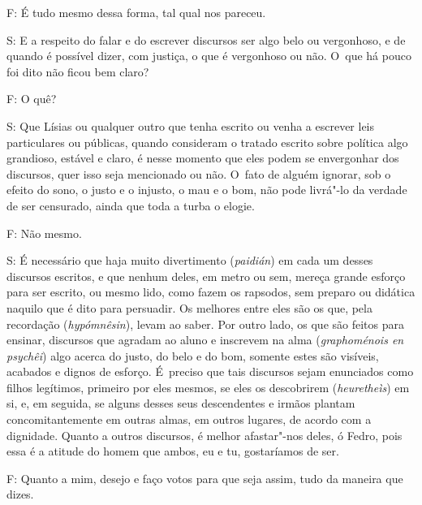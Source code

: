 

F: É tudo mesmo dessa forma, tal qual nos pareceu.

 

S: E a respeito do falar e do escrever discursos ser algo belo ou
vergonhoso, e de quando é possível dizer, com justiça, o que é
vergonhoso ou não. O~que há pouco foi dito não ficou bem claro?

 

F: O quê?

 

S: Que Lísias ou qualquer outro que tenha escrito ou venha a escrever
leis particulares ou públicas, quando consideram o tratado escrito sobre
política algo grandioso, estável e claro, é nesse momento que eles podem
se envergonhar dos discursos, quer isso seja mencionado ou não. O~fato
de alguém ignorar, sob o efeito do sono, \bekker{[277e]} o justo e o injusto,
o mau e o bom, não pode livrá"-lo da verdade de ser censurado, ainda que
toda a turba o elogie.

 

F: Não mesmo.

 

S: É necessário que haja muito divertimento (\emph{paidián}) em cada um
desses discursos escritos, e que nenhum deles, em metro ou sem, mereça
grande esforço para ser escrito, ou mesmo lido, como fazem os rapsodos,
sem preparo ou didática naquilo que é dito para persuadir. \bekker{[278a]} Os
melhores entre eles são os que, pela recordação (\emph{hypómnêsin}),
levam ao saber. Por outro lado, os que são feitos para ensinar,
discursos que agradam ao aluno e inscrevem na alma (\emph{graphoménois
en psychêi}) algo acerca do justo, do belo e do bom, somente estes são
visíveis, acabados e dignos de esforço. É~preciso que tais discursos
sejam enunciados como filhos legítimos, \bekker{[278b]} primeiro por eles
mesmos, se eles os descobrirem (\emph{heuretheìs}) em si, e, em seguida,
se alguns desses seus descendentes e irmãos plantam concomitantemente em
outras almas, em outros lugares, de acordo com a dignidade. Quanto a
outros discursos, é melhor afastar"-nos deles, ó Fedro, pois essa é a
atitude do homem que ambos, eu e tu, gostaríamos de ser.

 

F: Quanto a mim, desejo e faço votos para que seja assim, tudo da
maneira que dizes.

 

